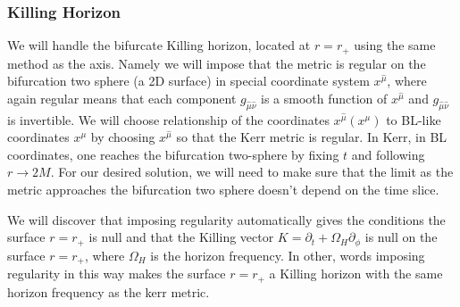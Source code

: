\documentclass[aps,prd,amsmath,showpacs,amssymb,superscriptaddress,nofootinbib,longbibliography,eqsecnum,preprintnumbers]{revtex4-1}
\begin{document}
\subsubsection{Killing Horizon}
We will handle the bifurcate Killing horizon, located at $r=r_+$ using the same method as the axis. Namely we will impose  that the metric is regular on the bifurcation two sphere (a 2D surface) in special coordinate system $x^{\hat \mu}$, where again regular means that each component $g_{\hat \mu \hat \nu}$ is a smooth function of $x^{\hat \mu}$ and $g_{\hat \mu \hat \nu}$ is invertible. We will choose relationship of the coordinates $x^{\hat \mu}(x^{\mu})$ to BL-like coordinates $x^{\mu}$ by choosing $x^{\hat \mu}$ so that the Kerr metric is regular. In Kerr, in BL coordinates, one reaches the bifurcation two-sphere by fixing $t$ and following $r\to2M$. For our desired solution, we will need to make sure that the limit as the metric approaches the bifurcation two sphere doesn't depend on the time slice. 

We will discover that imposing regularity automatically gives the conditions the surface $r=r_+$ is null and that the Killing vector $K= \partial_t +\Omega_H \partial_\phi$  is null on the surface $r=r_+$, where  $\Omega_H$ is the horizon frequency. In other, words imposing regularity in this way makes the surface $r=r_+$ a Killing horizon with the same horizon frequency as the kerr metric.
\end{document}
